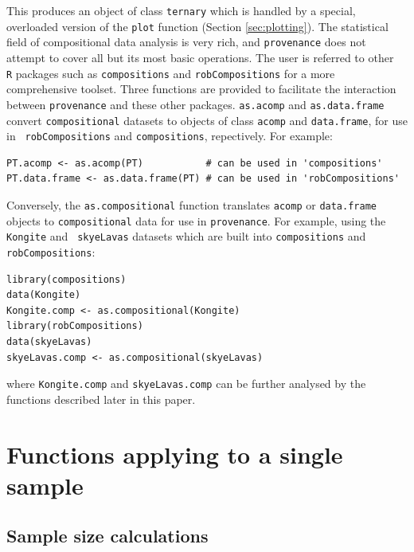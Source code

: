 \documentclass{article}
\begin{document}
This produces an object of class {\tt ternary} which is handled by a
special, overloaded version of the {\tt plot} function (Section
\ref{sec:plotting}). The statistical field of compositional data
analysis is very rich, and {\tt provenance} does not attempt to cover
all but its most basic operations. The user is referred to other {\tt
  R} packages such as {\tt compositions} \citep{vandenboogaart2008}
and {\tt robCompositions} \citep{templ2011} for a more comprehensive
toolset. Three functions are provided to facilitate the interaction
between {\tt provenance} and these other packages.  {\tt as.acomp} and
{\tt as.data.frame} convert {\tt compositional} datasets to objects of
class {\tt acomp} and {\tt data.frame}, for use in {\tt
  robCompositions} and {\tt compositions}, repectively. For example:

\begin{verbatim}
PT.acomp <- as.acomp(PT)           # can be used in 'compositions'
PT.data.frame <- as.data.frame(PT) # can be used in 'robCompositions'
\end{verbatim}

Conversely, the {\tt as.compositional} function translates {\tt acomp}
or {\tt data.frame} objects to {\tt compositional} data for use in
{\tt provenance}. For example, using the {\tt Kongite} and {\tt
  skyeLavas} datasets which are built into {\tt compositions} and {\tt
  robCompositions}:

\begin{verbatim}
library(compositions)
data(Kongite)
Kongite.comp <- as.compositional(Kongite)
library(robCompositions)
data(skyeLavas)
skyeLavas.comp <- as.compositional(skyeLavas)
\end{verbatim}

where {\tt Kongite.comp} and {\tt skyeLavas.comp} can be further
analysed by the functions described later in this paper.

\section{Functions applying to a single sample}
\label{sec:singlesample}

\subsection{Sample size calculations}
\label{sec:samplesize}
\end{document}
